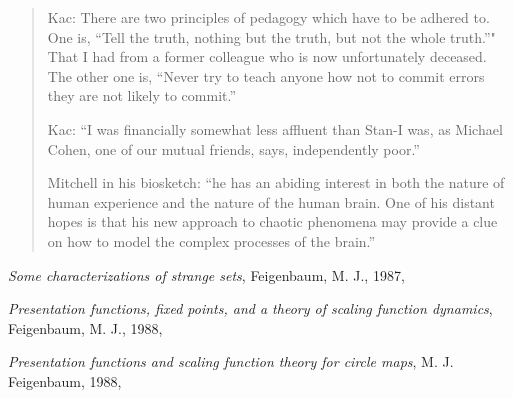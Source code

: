 \begin{description}
\begin{quote}
Kac: There are two principles of pedagogy which have to be adhered to.
One is, ``Tell the truth, nothing but the truth, but not the whole
truth.''" That I had from a former colleague who is now unfortunately
deceased. The other one is, ``Never try to teach anyone how not to commit
errors they are not likely to commit.''

Kac: ``I was financially somewhat less affluent than Stan-I was, as
Michael Cohen, one of our mutual friends, says, independently poor.''

Mitchell in his biosketch: ``he has an abiding interest in both the
nature of human experience and the nature of the human brain. One of his
distant hopes is that his new approach to chaotic phenomena may provide a
clue on how to model the complex processes of the brain.''
\end{quote}
\end{description}

\medskip

{\em Some characterizations of strange sets},
{Feigenbaum, M. J.},
{1987},

{\em Presentation functions, fixed points, and a theory of scaling function dynamics},
{Feigenbaum, M. J.},
{1988},

{\em Presentation functions and scaling function theory for circle maps},
{M. J. Feigenbaum},
{1988},

